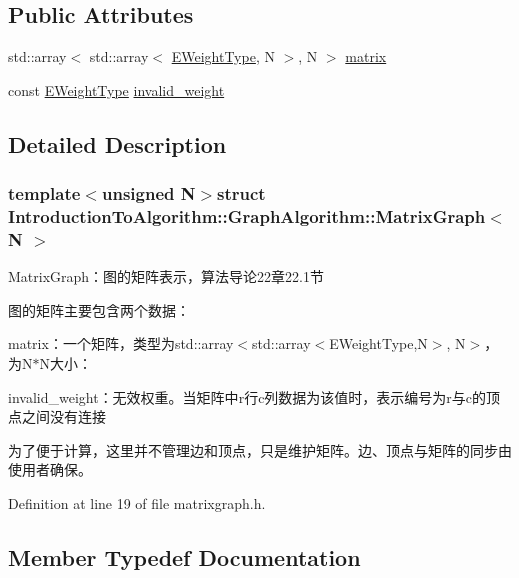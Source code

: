 \subsection*{Public Attributes}
\begin{DoxyCompactItemize}
\item 
std\+::array$<$ std\+::array$<$ \hyperlink{struct_introduction_to_algorithm_1_1_graph_algorithm_1_1_matrix_graph_af54dbf6d171b89b81b490de13f1fb02f}{E\+Weight\+Type}, N $>$, N $>$ \hyperlink{struct_introduction_to_algorithm_1_1_graph_algorithm_1_1_matrix_graph_ae1febbc0e4a86c325a16a942947a03bf}{matrix}
\item 
const \hyperlink{struct_introduction_to_algorithm_1_1_graph_algorithm_1_1_matrix_graph_af54dbf6d171b89b81b490de13f1fb02f}{E\+Weight\+Type} \hyperlink{struct_introduction_to_algorithm_1_1_graph_algorithm_1_1_matrix_graph_accc79376e509d7ffa016ef5003512976}{invalid\+\_\+weight}
\end{DoxyCompactItemize}


\subsection{Detailed Description}
\subsubsection*{template$<$unsigned N$>$struct Introduction\+To\+Algorithm\+::\+Graph\+Algorithm\+::\+Matrix\+Graph$<$ N $>$}

Matrix\+Graph：图的矩阵表示，算法导论22章22.1节 

图的矩阵主要包含两个数据：


\begin{DoxyItemize}
\item {\ttfamily matrix}：一个矩阵，类型为{\ttfamily std\+::array$<$std\+::array$<$E\+Weight\+Type,N$>$, N$>$}，为{\ttfamily N$\ast$\+N}大小：
\item {\ttfamily invalid\+\_\+weight}：无效权重。当矩阵中{\ttfamily r}行{\ttfamily c}列数据为该值时，表示编号为{\ttfamily r}与{\ttfamily c}的顶点之间没有连接
\end{DoxyItemize}

为了便于计算，这里并不管理边和顶点，只是维护矩阵。边、顶点与矩阵的同步由使用者确保。 

Definition at line 19 of file matrixgraph.\+h.



\subsection{Member Typedef Documentation}
\hypertarget{struct_introduction_to_algorithm_1_1_graph_algorithm_1_1_matrix_graph_ad698e07bacdb3f332c4f5d34bdb49463}{}
